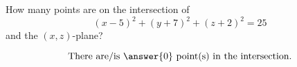 \documentclass{ximera}
\author{Bart Snapp}
\begin{document}
\begin{exercise}
  How many points are on the intersection of
  \[
  (x-5)^2 + (y+7)^2 + (z+2)^2 = 25
  \]
  and the $(x,z)$-plane?
  \begin{prompt}
  \[
  \text{There are/is $\answer{0}$ point(s) in the intersection.}
  \]
  \end{prompt}
\end{exercise}
\end{document}
